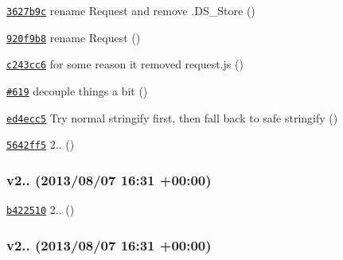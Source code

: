 \begin{DoxyItemize}
\item \href{https://github.com/mikeal/request/commit/3627b9cc7752cfe57ac609ed613509ff61017045}{\tt 3627b9c} rename Request and remove .D\+S\+\_\+\+Store ()
\item \href{https://github.com/mikeal/request/commit/920f9b88f7dd8f8d153e72371b1bf2d16d5e4160}{\tt 920f9b8} rename Request ()
\item \href{https://github.com/mikeal/request/commit/c243cc66131216bb57bcc0fd79c250a7927ee424}{\tt c243cc6} for some reason it removed request.\+js ()
\item \href{https://github.com/mikeal/request/pull/619}{\tt \#619} decouple things a bit ()
\item \href{https://github.com/mikeal/request/commit/ed4ecc5ae5cd1d9559a937e84638c9234244878b}{\tt ed4ecc5} Try normal stringify first, then fall back to safe stringify ()
\item \href{https://github.com/mikeal/request/commit/5642ff56e64c19e8183dcd5b6f9d07cca295a79e}{\tt 5642ff5} 2.. ()
\end{DoxyItemize}

\subsubsection*{v2.. (2013/08/07 16\+:31 +00\+:00)}


\begin{DoxyItemize}
\item \href{https://github.com/mikeal/request/commit/b422510ba16315c3e0e1293a17f3a8fa7a653a77}{\tt b422510} 2.. ()
\end{DoxyItemize}

\subsubsection*{v2.. (2013/08/07 16\+:31 +00\+:00)}


